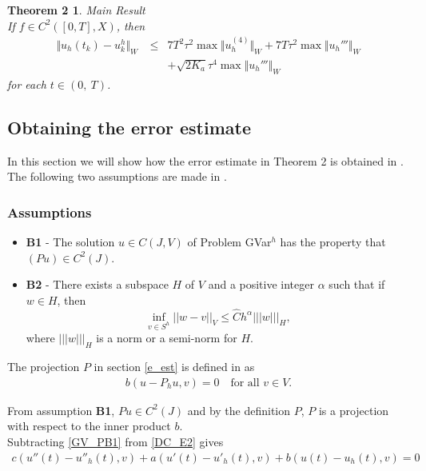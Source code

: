 \documentclass[../../main.tex]{subfiles}
\begin{document}
\newtheorem*{DC_Thm5}{Theorem 2}
\begin{DC_Thm5}
	{Main Result}\\
	If $f\in C^{2}([0,T],X)$, then
	\begin{eqnarray*}
		\Vert u_{h}(t_{k})-u_{k}^{h}\Vert_{W}\ & \leq & 7T^{2}\tau^{2}\max\Vert u_{h}^{(4)}\Vert_{W}+7T\tau^{2}\max\Vert u_{h}'''\Vert_{W}\\
		& & + \sqrt{2K_{a}}\tau^{4}\max\Vert u_{h}'''\Vert_{W}
	\end{eqnarray*}
	for each $t\in(0,\ T)$.
\end{DC_Thm5}

\subsection{Obtaining the error estimate}
In this section we will show how the error estimate in Theorem 2 is obtained in \cite{BV13}.\\

The following two assumptions are made in \cite{BV13}.

\subsubsection*{Assumptions}
\begin{itemize}
	\item[] \textbf{B1} - The solution $u \in C(J,V)$ of Problem GVar$^h$ has the property that $(Pu) \in C^2(J)$.
	
	\item[] \textbf{B2} - There exists a subspace $H$ of $V$ and a positive integer $\alpha$ such that if $w \in H$, then $$\inf_{v\in S^{h}}||w-v||_V \leq \hat{C} h^\alpha|||w|||_H,$$ where $|||w|||_H$ is a norm or a semi-norm for $H$.
\end{itemize}

The projection $P$ in section \eqref{e_est} is defined in \cite{BV13} as
\begin{eqnarray*}
	b(u-P_hu,v) = 0 \ \ \ \textrm{ for all } v \in V.
\end{eqnarray*}

From assumption \textbf{B1}, $Pu \in C^2(J)$ and by the definition $P$, $P$ is a projection with respect to the inner product $b$.\\

Subtracting \eqref{GV_PB1} from \eqref{DC_E2} gives
\begin{eqnarray*}
	c(u''(t)-u''_h(t),v) + a(u'(t)-u'_h(t),v) + b(u(t)-u_h(t),v) = 0
\end{eqnarray*}
\end{document}
